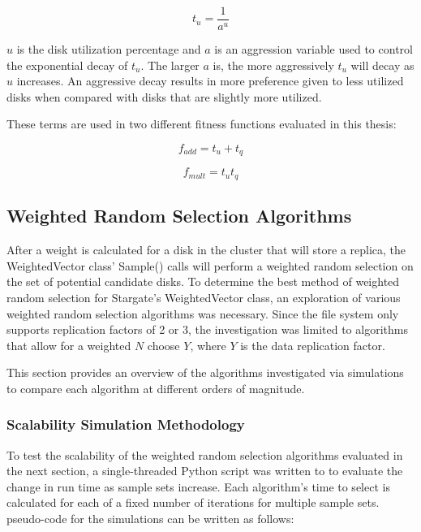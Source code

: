 \documentclass[12pt]{article}
\begin{document}
  \begin{equation}
    t_{u} = \frac{1}{a^{u}}
  \end{equation}

  $u$ is the disk utilization percentage and $a$ is an aggression variable used
  to control the exponential decay of $t_{u}$. The larger $a$ is, the
  more aggressively $t_{u}$ will decay as $u$ increases. An
  aggressive decay results in more preference given to less utilized disks when
  compared with disks that are slightly more utilized.

  These terms are used in two different fitness functions evaluated in this
  thesis:

  \begin{equation}
    f_{add} = t_{u} + t_{q}
  \end{equation}

  \begin{equation}
    f_{mult} = t_{u}t_{q}
  \end{equation}


  \subsection{Weighted Random Selection Algorithms}

  After a weight is calculated for a disk in the cluster that will store a
  replica, the WeightedVector class' Sample() calls will perform a weighted
  random selection on the set of potential candidate disks. To determine the
  best method of weighted random selection for Stargate's WeightedVector class,
  an exploration of various weighted random selection algorithms was necessary.
  Since the file system only supports replication factors of 2 or 3, the
  investigation was limited to algorithms that allow for a weighted $N$ choose
  $Y$, where $Y$ is the data replication factor.

  This section provides an overview of the algorithms investigated via
  simulations to compare each algorithm at different orders of magnitude.

    \subsubsection{Scalability Simulation Methodology}
     To test the scalability of the weighted random selection algorithms
     evaluated in the next section, a single-threaded Python \cite{python}
     script was written to to evaluate the change in run time as sample sets
     increase. Each algorithm's time to select is calculated for each of a
     fixed number of iterations for multiple sample sets. pseudo-code for the
     simulations can be written as follows:
\end{document}
